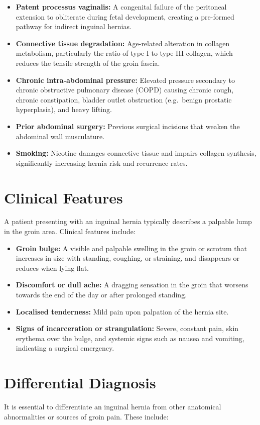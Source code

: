 \begin{itemize}
    \item \textbf{Patent processus vaginalis:} A congenital failure of the peritoneal extension to obliterate during fetal development, creating a pre-formed pathway for indirect inguinal hernias.
    \item \textbf{Connective tissue degradation:} Age-related alteration in collagen metabolism, particularly the ratio of type I to type III collagen, which reduces the tensile strength of the groin fascia.
    \item \textbf{Chronic intra-abdominal pressure:} Elevated pressure secondary to chronic obstructive pulmonary disease (COPD) causing chronic cough, chronic constipation, bladder outlet obstruction (e.g.\ benign prostatic hyperplasia), and heavy lifting.
    \item \textbf{Prior abdominal surgery:} Previous surgical incisions that weaken the abdominal wall musculature.
    \item \textbf{Smoking:} Nicotine damages connective tissue and impairs collagen synthesis, significantly increasing hernia risk and recurrence rates.
\end{itemize}

\section*{Clinical Features}
A patient presenting with an inguinal hernia typically describes a palpable lump in the groin area. Clinical features include:

\begin{itemize}
    \item \textbf{Groin bulge:} A visible and palpable swelling in the groin or scrotum that increases in size with standing, coughing, or straining, and disappears or reduces when lying flat.
    \item \textbf{Discomfort or dull ache:} A dragging sensation in the groin that worsens towards the end of the day or after prolonged standing.
    \item \textbf{Localised tenderness:} Mild pain upon palpation of the hernia site.
    \item \textbf{Signs of incarceration or strangulation:} Severe, constant pain, skin erythema over the bulge, and systemic signs such as nausea and vomiting, indicating a surgical emergency.
\end{itemize}

\section*{Differential Diagnosis}
It is essential to differentiate an inguinal hernia from other anatomical abnormalities or sources of groin pain. These include:

